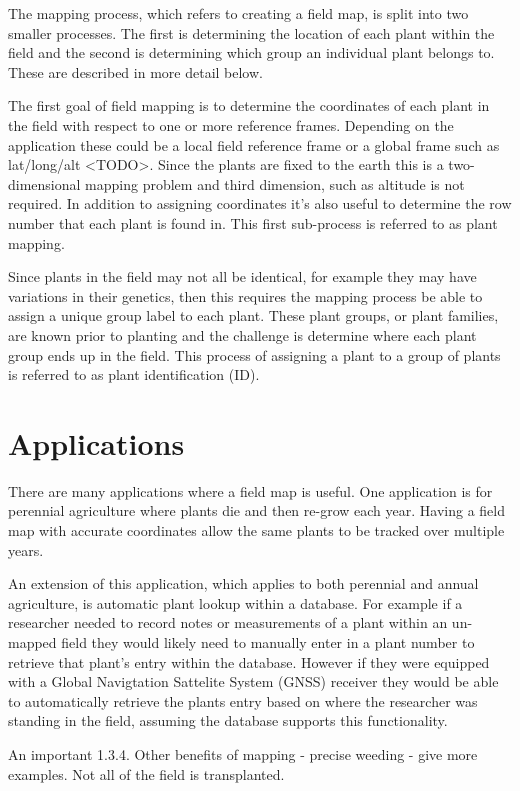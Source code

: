 The mapping process, which refers to creating a field map, is split into two smaller processes.  The first is determining the location of each plant within the field and the second is determining which group an individual plant belongs to. These are described in more detail below. 

The first goal of field mapping is to determine the coordinates of each plant in the field with respect to one or more reference frames.  Depending on the application these could be a local field reference frame or a global frame such as lat/long/alt <TODO>.  Since the plants are fixed to the earth this is a two-dimensional mapping problem and third dimension, such as altitude is not required.  In addition to assigning coordinates it's also useful to determine the row number that each plant is found in.  This first sub-process is referred to as plant mapping. 

Since plants in the field may not all be identical, for example they may have variations in their genetics, then this requires the mapping process be able to assign a unique group label to each plant.  These plant groups, or plant families, are known prior to planting and the challenge is determine where each plant group ends up in the field.  This process of assigning a plant to a group of plants is referred to as plant identification (ID).

\section{Applications}

There are many applications where a field map is useful.  One application is for perennial agriculture where plants die and then re-grow each year.  Having a field map with accurate coordinates allow the same plants to be tracked over multiple years.

An extension of this application, which applies to both perennial and annual agriculture, is automatic plant lookup within a database.  For example if a researcher needed to record notes or measurements of a plant within an un-mapped field they would likely need to manually enter in a plant number to retrieve that plant's entry within the database.  However if they were equipped with a Global Navigtation Sattelite System (GNSS) receiver they would be able to automatically retrieve the plants entry based on where the researcher was standing in the field, assuming the database supports this functionality. 

An important  
1.3.4.	Other benefits of mapping - precise weeding - give more examples.  Not all of the field is transplanted. 

